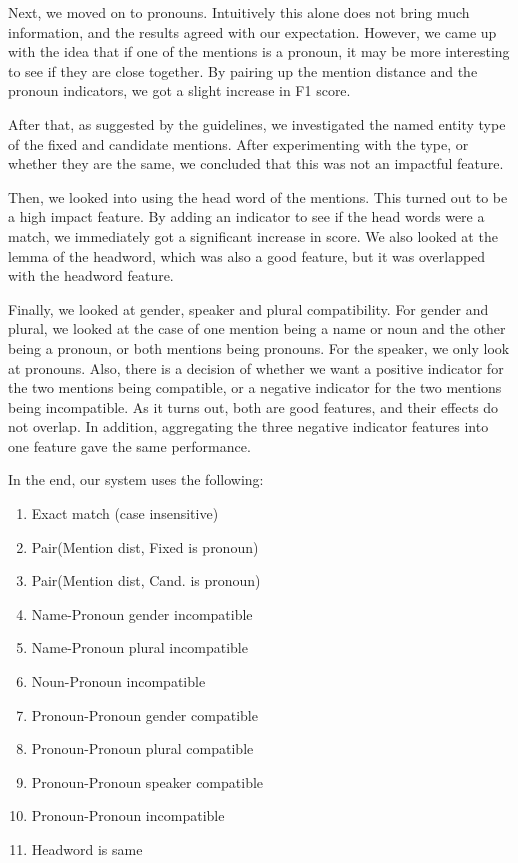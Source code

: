 \documentclass[12pt, twocolumn]{article}
\begin{document}
Next, we moved on to pronouns. Intuitively this alone does not bring much information, and the results agreed with our expectation. However, we came up with the idea that if one of the mentions is a pronoun, it may be more interesting to see if they are close together. By pairing up the mention distance and the pronoun indicators, we got a slight increase in F1 score.

After that, as suggested by the guidelines, we investigated the named entity type of the fixed and candidate mentions. After experimenting with the type, or whether they are the same, we concluded that this was not an impactful feature.

Then, we looked into using the head word of the mentions. This turned out to be a high impact feature. By adding an indicator to see if the head words were a match, we immediately got a significant increase in score. We also looked at the lemma of the headword, which was also a good feature, but it was overlapped with the headword feature.

Finally, we looked at gender, speaker and plural compatibility. For gender and plural, we looked at the case of one mention being a name or noun and the other being a pronoun, or both mentions being pronouns. For the speaker, we only look at pronouns. Also, there is a decision of whether we want a positive indicator for the two mentions being compatible, or a negative indicator for the two mentions being incompatible. As it turns out, both are good features, and their effects do not overlap. In addition, aggregating the three negative indicator features into one feature gave the same performance.

In the end, our system uses the following:
\begin{enumerate}[(1)]
\item Exact match (case insensitive)
\item Pair(Mention dist, Fixed is pronoun) 
\item Pair(Mention dist, Cand. is pronoun) 
\item Name-Pronoun gender incompatible
\item Name-Pronoun plural incompatible
\item Noun-Pronoun incompatible
\item Pronoun-Pronoun gender compatible
\item Pronoun-Pronoun plural compatible
\item Pronoun-Pronoun speaker compatible
\item Pronoun-Pronoun incompatible
\item Headword is same
\end{enumerate}
\end{document}
